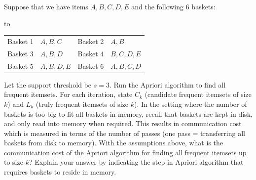 \documentclass[10pt,a4paper,twocolumn]{article}
\newenvironment{examtable}[1]{%
  \par\addvspace{2pt}\noindent\hbox to \linewidth\bgroup\hfil
  \setlength{\tabcolsep}{4pt}%
  \renewcommand{\arraystretch}{1.12}\begin{tabular}{#1}%
}{\end{tabular}\hfil\egroup\par\addvspace{2pt}}
\begin{document}
Suppose that we have items $A,B,C,D,E$ and the following 6 baskets:
\begin{examtable}{@{}ll@{\qquad}ll@{}}
Basket 1 & $A,B,C$ & Basket 2 & $A,B$\\
Basket 3 & $A,B,D$ & Basket 4 & $B,C,D,E$\\
Basket 5 & $A,B,D,E$ & Basket 6 & $A,B,C,D$
\end{examtable}
 Let the support threshold be $s=3$. Run the Apriori algorithm to find all frequent itemsets. For each iteration, state $C_k$ (candidate frequent itemsets of size $k$) and $L_k$ (truly frequent itemsets of size $k$).
 In the setting where the number of baskets is too big to fit all baskets in memory, recall that baskets are kept in disk, and only read into memory when required. This results in communication cost which is measured in terms of the number of passes (one pass = transferring all baskets from disk to memory). With the assumptions above, what is the communication cost of the Apriori algorithm for finding all frequent itemsets up to size $k$? Explain your answer by indicating the step in Apriori algorithm that requires baskets to reside in memory.
\end{document}

